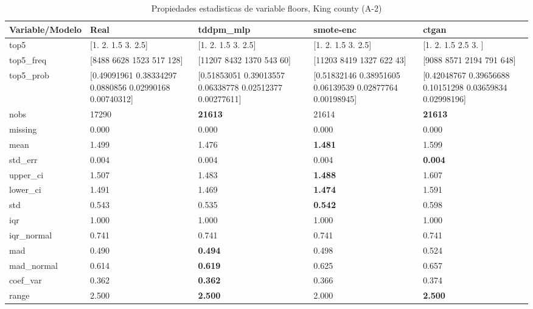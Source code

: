 \begin{table}[H]
\centering
\fontsize{8}{14}\selectfont
\caption{Propiedades  estadisticas de variable floors, King county (A-2)}
\label{table-stats-king county-a-2-floors}
\begin{tabular}{|l|m{10em}|m{10em}|m{10em}|m{10em}|}
\hline
 \rowcolor[gray]{0.8}
Variable/Modelo & Real & tddpm\_mlp & smote-enc & ctgan \\
\hline top5 & [1.  2.  1.5 3.  2.5] & [1.  2.  1.5 3.  2.5] & [1.  2.  1.5 3.  2.5] & [1.  2.  1.5 2.5 3. ] \\
\hline top5\_freq & [8488 6628 1523  517  128] & [11207  8432  1370   543    60] & [11203  8419  1327   622    43] & [9088 8571 2194  791  648] \\
\hline top5\_prob & [0.49091961 0.38334297 0.0880856  0.02990168 0.00740312] & [0.51853051 0.39013557 0.06338778 0.02512377 0.00277611] & [0.51832146 0.38951605 0.06139539 0.02877764 0.00198945] & [0.42048767 0.39656688 0.10151298 0.03659834 0.02998196] \\
\hline nobs & 17290 & \bfseries 21613 & \cellcolor[rgb]{0.9, 0.54, 0.52} 21614 & \bfseries 21613 \\
\hline missing & 0.000 & 0.000 & 0.000 & 0.000 \\
\hline mean & 1.499 & 1.476 & \bfseries 1.481 & \cellcolor[rgb]{0.9, 0.54, 0.52} 1.599 \\
\hline std\_err & 0.004 & \cellcolor[rgb]{0.9, 0.54, 0.52} 0.004 & 0.004 & \bfseries 0.004 \\
\hline upper\_ci & 1.507 & 1.483 & \bfseries 1.488 & \cellcolor[rgb]{0.9, 0.54, 0.52} 1.607 \\
\hline lower\_ci & 1.491 & 1.469 & \bfseries 1.474 & \cellcolor[rgb]{0.9, 0.54, 0.52} 1.591 \\
\hline std & 0.543 & 0.535 & \bfseries 0.542 & \cellcolor[rgb]{0.9, 0.54, 0.52} 0.598 \\
\hline iqr & 1.000 & 1.000 & 1.000 & 1.000 \\
\hline iqr\_normal & 0.741 & 0.741 & 0.741 & 0.741 \\
\hline mad & 0.490 & \bfseries 0.494 & 0.498 & \cellcolor[rgb]{0.9, 0.54, 0.52} 0.524 \\
\hline mad\_normal & 0.614 & \bfseries 0.619 & 0.625 & \cellcolor[rgb]{0.9, 0.54, 0.52} 0.657 \\
\hline coef\_var & 0.362 & \bfseries 0.362 & 0.366 & \cellcolor[rgb]{0.9, 0.54, 0.52} 0.374 \\
\hline range & 2.500 & \bfseries 2.500 & \cellcolor[rgb]{0.9, 0.54, 0.52} 2.000 & \bfseries 2.500 \\

\end{tabular}
\end{table}
